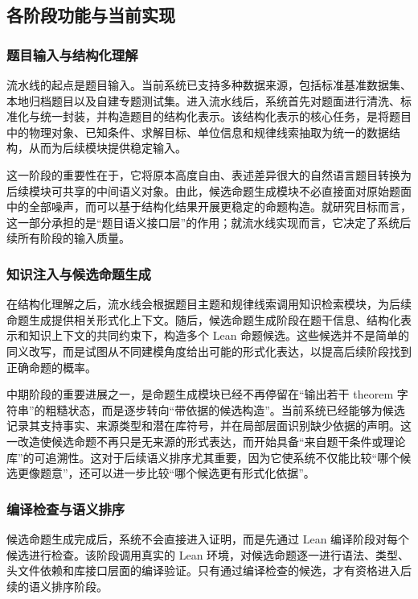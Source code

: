 \documentclass[12pt,a4paper]{ctexart}
\begin{document}
\subsection{各阶段功能与当前实现}

\subsubsection{题目输入与结构化理解}

流水线的起点是题目输入。当前系统已支持多种数据来源，包括标准基准数据集、本地归档题目以及自建专题测试集。进入流水线后，系统首先对题面进行清洗、标准化与统一封装，并构造题目的结构化表示。该结构化表示的核心任务，是将题目中的物理对象、已知条件、求解目标、单位信息和规律线索抽取为统一的数据结构，从而为后续模块提供稳定输入。

这一阶段的重要性在于，它将原本高度自由、表述差异很大的自然语言题目转换为后续模块可共享的中间语义对象。由此，候选命题生成模块不必直接面对原始题面中的全部噪声，而可以基于结构化结果开展更稳定的命题构造。就研究目标而言，这一部分承担的是“题目语义接口层”的作用；就流水线实现而言，它决定了系统后续所有阶段的输入质量。

\subsubsection{知识注入与候选命题生成}

在结构化理解之后，流水线会根据题目主题和规律线索调用知识检索模块，为后续命题生成提供相关形式化上下文。随后，候选命题生成阶段在题干信息、结构化表示和知识上下文的共同约束下，构造多个 Lean 命题候选。这些候选并不是简单的同义改写，而是试图从不同建模角度给出可能的形式化表达，以提高后续阶段找到正确命题的概率。

中期阶段的重要进展之一，是命题生成模块已经不再停留在“输出若干 theorem 字符串”的粗糙状态，而是逐步转向“带依据的候选构造”。当前系统已经能够为候选记录其支持事实、来源类型和潜在库符号，并在局部层面识别缺少依据的声明。这一改造使候选命题不再只是无来源的形式表达，而开始具备“来自题干条件或理论库”的可追溯性。这对于后续语义排序尤其重要，因为它使系统不仅能比较“哪个候选更像题意”，还可以进一步比较“哪个候选更有形式化依据”。

\subsubsection{编译检查与语义排序}

候选命题生成完成后，系统不会直接进入证明，而是先通过 Lean 编译阶段对每个候选进行检查。该阶段调用真实的 Lean 环境，对候选命题逐一进行语法、类型、头文件依赖和库接口层面的编译验证。只有通过编译检查的候选，才有资格进入后续的语义排序阶段。
\end{document}
